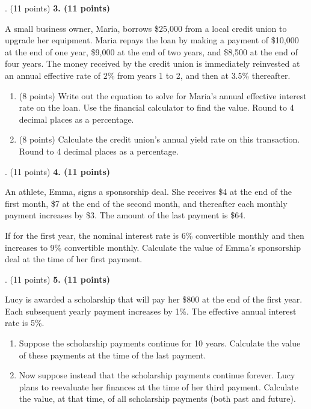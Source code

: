 \documentclass[12pt]{article}
\makeatletter
\newenvironment{problem}[1][]{%
  \bigskip%
  \noindent\begin{boxedminipage}{\columnwidth}%
  \def\@tempa{#1}%
  \ifx\@tempa\empty\else%
    \textbf{#1}\hspace{0.5em}%
  \fi%
}{%
  \end{boxedminipage}%
}
\makeatother
\begin{document}
\newpage


\begin{problem}[3. (11 points)]
A small business owner, Maria, borrows \$25{,}000 from a local credit union to upgrade her equipment. Maria repays the loan by making a payment of \$10{,}000 at the end of one year, \$9{,}000 at the end of two years, and \$8{,}500 at the end of four years. The money received by the credit union is immediately reinvested at an annual effective rate of $2\%$ from years 1 to 2, and then at $3.5\%$ thereafter.
    \begin{enumerate}[label=(\alph*)]
        \item (8 points) Write out the equation to solve for Maria’s annual effective interest rate on the loan. Use the financial calculator to find the value. Round to 4 decimal places as a percentage.
        \item (8 points) Calculate the credit union's annual yield rate on this transaction. Round to 4 decimal places as a percentage.
    \end{enumerate}
\end{problem}

\newpage



\begin{problem}[4. (11 points)]
An athlete, Emma, signs a sponsorship deal. She receives \$4 at the end of the first month, \$7 at the end of the second month, and thereafter each monthly payment increases by \$3. The amount of the last payment is \$64. 

\vspace{.25cm}

If for the first year, the nominal interest rate is 6\% convertible monthly and then increases to 9\% convertible monthly.  Calculate the value of Emma's sponsorship deal at the time of her first payment.
\end{problem}



\newpage


\begin{problem}[5. (11 points)]
Lucy is awarded a scholarship that will pay her \$800 at the end of the first year. Each subsequent yearly payment increases by 1\%. The effective annual interest rate is 5\%.

\begin{enumerate}[label=(\alph*)]
    \item Suppose the scholarship payments continue for 10 years. Calculate the value of these payments at the time of the last payment.
    \item Now suppose instead that the scholarship payments continue forever. Lucy plans to reevaluate her finances at the time of her third payment. Calculate the value, at that time, of all scholarship payments (both past and future).
\end{enumerate}
\end{problem}
\end{document}
